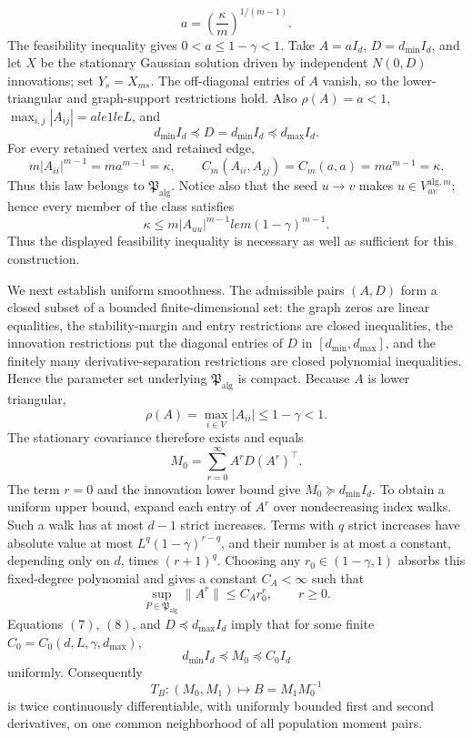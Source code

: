\[
 a=\left(\frac{\kappa}{m}\right)^{1/(m-1)}.
\tag{2}
\]
The feasibility inequality gives \(0<a\le1-\gamma<1\).  Take \(A=aI_d\), \(D=d_{\min}I_d\), and let \(X\) be the stationary Gaussian solution driven by independent \(N(0,D)\) innovations; set \(Y_s=X_{ms}\).  The off-diagonal entries of \(A\) vanish, so the lower-triangular and graph-support restrictions hold.  Also \(\rho(A)=a<1\), \(\max_{i,j}|A_{ij}|=ale1le L\), and
\[
 d_{\min}I_d\preceq D=d_{\min}I_d\preceq d_{\max}I_d.
\tag{3}
\]
For every retained vertex and retained edge,
\[
 m|A_{ii}|^{m-1}=ma^{m-1}=\kappa,
 \qquad
 C_m(A_{ii},A_{jj})=C_m(a,a)=ma^{m-1}=\kappa.
\tag{4}
\]
Thus this law belongs to \(\mathfrak P_{\mathrm{alg}}\).  Notice also that the seed \(u\to v\) makes \(u\in V_{uv}^{\mathrm{alg},m}\); hence every member of the class satisfies
\[
 \kappa\le m|A_{uu}|^{m-1}le m(1-\gamma)^{m-1}.
\tag{5}
\]
Thus the displayed feasibility inequality is necessary as well as sufficient for this construction.

We next establish uniform smoothness.  The admissible pairs \((A,D)\) form a closed subset of a bounded finite-dimensional set: the graph zeros are linear equalities, the stability-margin and entry restrictions are closed inequalities, the innovation restrictions put the diagonal entries of \(D\) in \([d_{\min},d_{\max}]\), and the finitely many derivative-separation restrictions are closed polynomial inequalities.  Hence the parameter set underlying \(\mathfrak P_{\mathrm{alg}}\) is compact.  Because \(A\) is lower triangular,
\[
 \rho(A)=\max_{i\in V}|A_{ii}|\le1-\gamma<1.
\tag{6}
\]
The stationary covariance therefore exists and equals
\[
 M_0=\sum_{r=0}^{\infty}A^rD(A^r)^\top.
\tag{7}
\]
The term \(r=0\) and the innovation lower bound give \(M_0\succeq d_{\min}I_d\).  To obtain a uniform upper bound, expand each entry of \(A^r\) over nondecreasing index walks.  Such a walk has at most \(d-1\) strict increases.  Terms with \(q\) strict increases have absolute value at most \(L^q(1-\gamma)^{r-q}\), and their number is at most a constant, depending only on \(d\), times \((r+1)^q\).  Choosing any \(r_0\in(1-\gamma,1)\) absorbs this fixed-degree polynomial and gives a constant \(C_A<\infty\) such that
\[
 \sup_{P\in\mathfrak P_{\mathrm{alg}}}\|A^r\|
 \le C_A r_0^r,
 \qquad r\ge0.
\tag{8}
\]
Equations \((7)\), \((8)\), and \(D\preceq d_{\max}I_d\) imply that for some finite \(C_0=C_0(d,L,\gamma,d_{\max})\),
\[
 d_{\min}I_d\preceq M_0\preceq C_0I_d
\tag{9}
\]
uniformly.  Consequently
\[
 T_B:(M_0,M_1)\longmapsto B=M_1M_0^{-1}
\tag{10}
\]
is twice continuously differentiable, with uniformly bounded first and second derivatives, on one common neighborhood of all population moment pairs.


